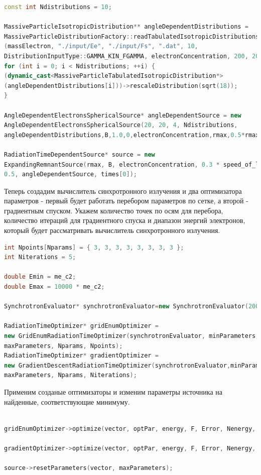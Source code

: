 \begin{lstlisting}[language=c++]
const int Ndistributions = 10;

MassiveParticleIsotropicDistribution** angleDependentDistributions = 
MassiveParticleDistributionFactory::readTabulatedIsotropicDistributionsAddPowerLawTail
(massElectron, "./input/Ee", "./input/Fs", ".dat", 10, 
DistributionInputType::GAMMA_KIN_FGAMMA, electronConcentration, 200, 20 * me_c2, 3.5);
for (int i = 0; i < Ndistributions; ++i) {
(dynamic_cast<MassiveParticleTabulatedIsotropicDistribution*>
(angleDependentDistributions[i]))->rescaleDistribution(sqrt(18));
}

AngleDependentElectronsSphericalSource* angleDependentSource = new 
AngleDependentElectronsSphericalSource(20, 20, 4, Ndistributions, 
angleDependentDistributions,B,1.0,0,electronConcentration,rmax,0.5*rmax,distance);

RadiationTimeDependentSource* source = new 
ExpandingRemnantSource(rmax, B, electronConcentration, 0.3 * speed_of_light,
0.5, angleDependentSource, times[0]);

\end{lstlisting}

Теперь создадим вычислитель синхротронного излучения и два оптимизатора параметров - первый будет работать перебором параметров по сетке, а второй - градиентным спуском. Укажем количество точек по осям для перебора, количество итераций для градиентного спуска и диапазон энергий электронов, который будет рассматривать вычислитель синхротронного излучения.

\begin{lstlisting}[language=c++]
int Npoints[Nparams] = { 3, 3, 3, 3, 3, 3, 3, 3 };
int Niterations = 5;

double Emin = me_c2;
double Emax = 10000 * me_c2;

SynchrotronEvaluator* synchrotronEvaluator=new SynchrotronEvaluator(200, Emin, Emax);

RadiationTimeOptimizer* gridEnumOptimizer = 
new GridEnumRadiationTimeOptimizer(synchrotronEvaluator, minParameters, 
maxParameters, Nparams, Npoints);
RadiationTimeOptimizer* gradientOptimizer = 
new GradientDescentRadiationTimeOptimizer(synchrotronEvaluator,minParameters, 
maxParameters, Nparams, Niterations);
\end{lstlisting}

Применим созданые оптимизаторы и изменим параметры источника на найденные, соответствующие минимуму.

\begin{lstlisting}[language=c++]

gridEnumOptimizer->optimize(vector, optPar, energy, F, Error, Nenergy, Ntimes, times, source);

gradientOptimizer->optimize(vector, optPar, energy, F, Error, Nenergy, Ntimes, times, source);

source->resetParameters(vector, maxParameters);
\end{lstlisting}

